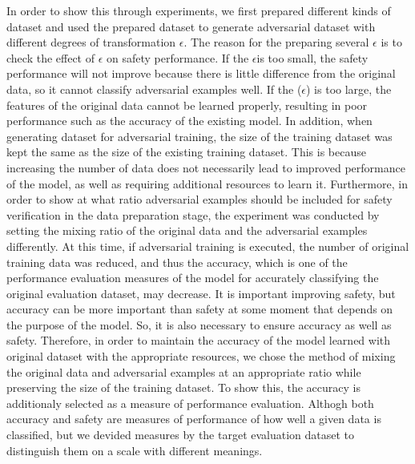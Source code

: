 \documentclass[journal,article,submit,moreauthors,pdftex]{Definitions/mdpi}
\begin{document}
In order to show this through experiments, we first prepared different kinds of dataset and used the prepared dataset to generate adversarial dataset with different degrees of transformation \begin{math}\epsilon\end{math}.
The reason for the preparing several \begin{math}\epsilon\end{math} is to check the effect of \begin{math}\epsilon\end{math} on safety performance. If the \begin{math}\epsilon\end{math}is too small, the safety performance will not improve because there is little difference from the original data, so it cannot classify adversarial examples well. If the (\begin{math}\epsilon\end{math}) is too large, the features of the original data cannot be learned properly, resulting in poor performance such as the accuracy of the existing model.
In addition, when generating dataset for adversarial training, the size of the training dataset was kept the same as the size of the existing training dataset.
This is because increasing the number of data does not necessarily lead to improved performance of the model, as well as requiring additional resources to learn it.
Furthermore, in order to show at what ratio adversarial examples should be included for safety verification in the data preparation stage, the experiment was conducted by setting the mixing ratio of the original data and the adversarial examples differently.
At this time, if adversarial training is executed, the number of original training data was reduced, and thus the accuracy, which is one of the performance evaluation measures of the model for accurately classifying the original evaluation dataset, may decrease.
It is important improving safety, but accuracy can be more important than safety at some moment that depends on the purpose of the model.
So, it is also necessary to ensure accuracy as well as safety. 
Therefore, in order to maintain the accuracy of the model learned with original dataset with the appropriate resources, we chose the method of mixing the original data and adversarial examples at an appropriate ratio while preserving the size of the training dataset.
To show this, the accuracy is additionaly selected as a measure of performance evaluation.
Althogh both accuracy and safety are measures of performance of how well a given data is classified, but we devided measures by the target evaluation dataset to distinguish them on a scale with different meanings.
\end{document}
